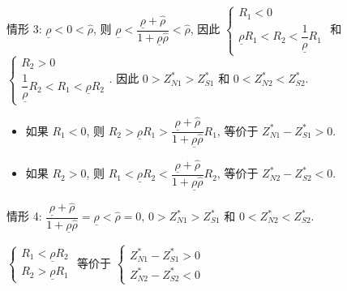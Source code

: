 \documentclass[10.0pt]{article}
\begin{document}
情形 3: $ \underline{\rho} < 0 < {\hat \rho} $, 则 $ \underline{\rho} < \dfrac{\underline{\rho} + {\hat \rho}}{1 + \underline{\rho} {\hat \rho}} < {\hat \rho} $, 因此 $ \left\{ \begin{matrix} R_1 < 0 \\ \underline{\rho} R_1 < R_2 < \dfrac{1}{\underline{\rho}} R_1 \end{matrix} \right. $ 和 $ \left\{ \begin{matrix} R_2 > 0 \\ \dfrac{1}{\underline{\rho}} R_2 < R_1 < \underline{\rho} R_2 \end{matrix} \right. $.
因此 $ 0 > Z_{N 1}^* > Z_{S 1}^* $ 和 $ 0 < Z_{N 2}^* < Z_{S 2}^* $.
\begin{itemize}
\item 如果 $ R_1 < 0 $, 则 $ R_2 > \underline{\rho} R_1 > \dfrac{\underline{\rho} + {\hat \rho}}{1 + \underline{\rho} {\hat \rho}} R_1 $, 等价于 $ Z_{N 1}^* - Z_{S 1}^* > 0 $.
\item 如果 $ R_2 > 0 $, 则 $ R_1 < \underline{\rho} R_2 < \dfrac{\underline{\rho} + {\hat \rho}}{1 + \underline{\rho} {\hat \rho}} R_2 $, 等价于 $ Z_{N 2}^* - Z_{S 2}^* < 0 $.
\end{itemize}

情形 4: $ \dfrac{\underline{\rho} + {\hat \rho}}{1 + \underline{\rho} {\hat \rho}} = \underline{\rho} < {\hat \rho} = 0 $, $ 0 > Z_{N 1}^* > Z_{S 1}^* $ 和 $ 0 < Z_{N 2}^* < Z_{S 2}^* $.

$ \left\{ \begin{matrix} R_1 < \underline{\rho} R_2 \\ R_2 > \underline{\rho} R_1 \end{matrix} \right. $ 等价于 $ \left\{ \begin{matrix} Z_{N 1}^* - Z_{S 1}^* > 0 \\ Z_{N 2}^* - Z_{S 2}^* < 0 \end{matrix} \right. $
\end{document}
